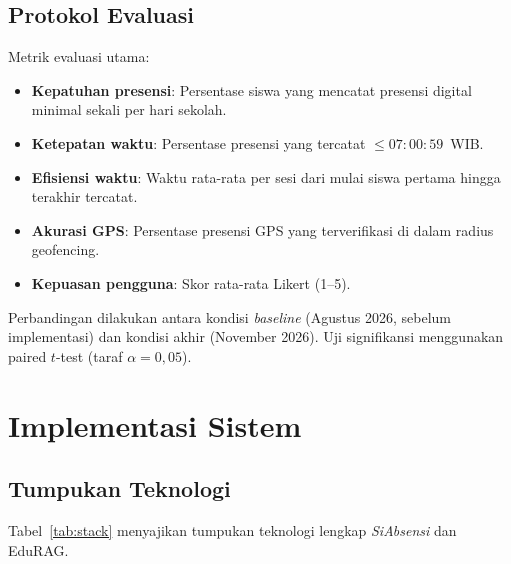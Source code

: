 \documentclass[12pt,a4paper]{article}
\newcommand{\edurag}{EduRAG}
\newcommand{\sistem}{\textit{SiAbsensi}}
\begin{document}
\subsection{Protokol Evaluasi}

Metrik evaluasi utama:
\begin{itemize}
  \item \textbf{Kepatuhan presensi}: Persentase siswa yang mencatat
        presensi digital minimal sekali per hari sekolah.
  \item \textbf{Ketepatan waktu}: Persentase presensi yang tercatat
        $\leq 07:00:59$~WIB.
  \item \textbf{Efisiensi waktu}: Waktu rata-rata per sesi dari
        mulai siswa pertama hingga terakhir tercatat.
  \item \textbf{Akurasi GPS}: Persentase presensi GPS yang terverifikasi
        di dalam radius geofencing.
  \item \textbf{Kepuasan pengguna}: Skor rata-rata Likert (1--5).
\end{itemize}

Perbandingan dilakukan antara kondisi \textit{baseline} (Agustus 2026,
sebelum implementasi) dan kondisi akhir (November 2026).
Uji signifikansi menggunakan paired $t$-test (taraf $\alpha = 0{,}05$).

\section{Implementasi Sistem}
\label{sec:impl}

\subsection{Tumpukan Teknologi}

Tabel~\ref{tab:stack} menyajikan tumpukan teknologi lengkap \sistem{}
dan \edurag{}.
\end{document}

